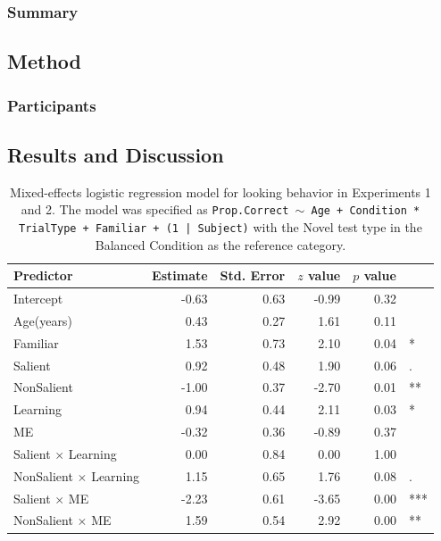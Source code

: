 \documentclass[man,floatsintext]{apa6}
\begin{document}
\subsubsection{Summary}

\subsection{Method}

\subsubsection{Participants}

\subsection{Results and Discussion}

\begin{table}[tb]
\centering
\begin{tabular}{lrrrrl}
 Predictor & Estimate & Std. Error & $z$ value & $p$ value &  \\ 
  \hline
Intercept & -0.63 & 0.63 & -0.99 & 0.32 &  \\ 
  Age(years) & 0.43 & 0.27 & 1.61 & 0.11 &  \\ 
  Familiar & 1.53 & 0.73 & 2.10 & 0.04 & * \\ 
  Salient & 0.92 & 0.48 & 1.90 & 0.06 & . \\ 
  NonSalient & -1.00 & 0.37 & -2.70 & 0.01 & ** \\ 
  Learning & 0.94 & 0.44 & 2.11 & 0.03 & * \\ 
  ME & -0.32 & 0.36 & -0.89 & 0.37 &  \\ 
  Salient $\times$ Learning & 0.00 & 0.84 & 0.00 & 1.00 &  \\ 
  NonSalient $\times$ Learning & 1.15 & 0.65 & 1.76 & 0.08 & . \\ 
  Salient $\times$ ME & -2.23 & 0.61 & -3.65 & 0.00 & *** \\ 
  NonSalient $\times$ ME & 1.59 & 0.54 & 2.92 & 0.00 & ** \\ 
   \hline
\end{tabular}
\vspace{6pt}
\caption{\label{tab:model_table} Mixed-effects logistic regression model for looking behavior in Experiments 1 and 2. The model was specified as \small{\tt{Prop.Correct $\sim$ Age + Condition * TrialType + Familiar + (1 | Subject)}} with the Novel test type in the Balanced Condition as the reference category.}
\end{table}
\end{document}
